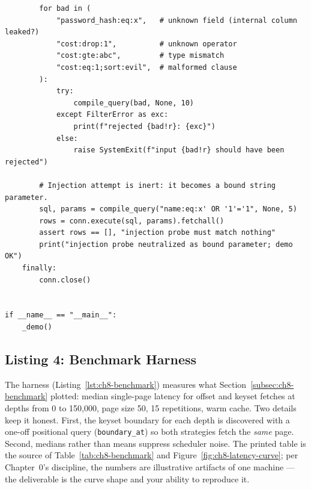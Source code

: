 \begin{verbatim}
        for bad in (
            "password_hash:eq:x",   # unknown field (internal column leaked?)
            "cost:drop:1",          # unknown operator
            "cost:gte:abc",         # type mismatch
            "cost:eq:1;sort:evil",  # malformed clause
        ):
            try:
                compile_query(bad, None, 10)
            except FilterError as exc:
                print(f"rejected {bad!r}: {exc}")
            else:
                raise SystemExit(f"input {bad!r} should have been rejected")

        # Injection attempt is inert: it becomes a bound string parameter.
        sql, params = compile_query("name:eq:x' OR '1'='1", None, 5)
        rows = conn.execute(sql, params).fetchall()
        assert rows == [], "injection probe must match nothing"
        print("injection probe neutralized as bound parameter; demo OK")
    finally:
        conn.close()


if __name__ == "__main__":
    _demo()
\end{verbatim}

\subsection{Listing 4: Benchmark Harness}
\label{subsec:ch8-code-benchmark}

The harness (Listing~\ref{lst:ch8-benchmark}) measures what
Section~\ref{subsec:ch8-benchmark} plotted: median single-page latency for
offset and keyset fetches at depths from 0 to 150{,}000, page size 50, 15
repetitions, warm cache. Two details keep it honest. First, the keyset
boundary for each depth is discovered with a one-off positional query
(\texttt{boundary\_at}) so both strategies fetch the \emph{same} page.
Second, medians rather than means suppress scheduler noise. The printed
table is the source of Table~\ref{tab:ch8-benchmark} and
Figure~\ref{fig:ch8-latency-curve}; per Chapter~0's discipline, the numbers
are illustrative artifacts of one machine --- the deliverable is the curve
shape and your ability to reproduce it.

